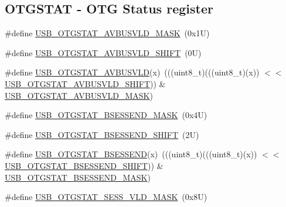 \subsection*{O\+T\+G\+S\+T\+AT -\/ O\+TG Status register}
\begin{DoxyCompactItemize}
\item 
\#define \mbox{\hyperlink{group___u_s_b___register___masks_gaad4e0319a6f42042472b52c8d1ec1c77}{U\+S\+B\+\_\+\+O\+T\+G\+S\+T\+A\+T\+\_\+\+A\+V\+B\+U\+S\+V\+L\+D\+\_\+\+M\+A\+SK}}~(0x1\+U)
\item 
\#define \mbox{\hyperlink{group___u_s_b___register___masks_ga66258b09ad8ec5462b8594ce5ac7384c}{U\+S\+B\+\_\+\+O\+T\+G\+S\+T\+A\+T\+\_\+\+A\+V\+B\+U\+S\+V\+L\+D\+\_\+\+S\+H\+I\+FT}}~(0\+U)
\item 
\#define \mbox{\hyperlink{group___u_s_b___register___masks_ga5a189909285a57f1076d9c2f860d7b71}{U\+S\+B\+\_\+\+O\+T\+G\+S\+T\+A\+T\+\_\+\+A\+V\+B\+U\+S\+V\+LD}}(x)~(((uint8\+\_\+t)(((uint8\+\_\+t)(x)) $<$$<$ \mbox{\hyperlink{group___u_s_b___register___masks_ga66258b09ad8ec5462b8594ce5ac7384c}{U\+S\+B\+\_\+\+O\+T\+G\+S\+T\+A\+T\+\_\+\+A\+V\+B\+U\+S\+V\+L\+D\+\_\+\+S\+H\+I\+FT}})) \& \mbox{\hyperlink{group___u_s_b___register___masks_gaad4e0319a6f42042472b52c8d1ec1c77}{U\+S\+B\+\_\+\+O\+T\+G\+S\+T\+A\+T\+\_\+\+A\+V\+B\+U\+S\+V\+L\+D\+\_\+\+M\+A\+SK}})
\item 
\#define \mbox{\hyperlink{group___u_s_b___register___masks_gabcc7c3e58301a6abc07915a5deb92d39}{U\+S\+B\+\_\+\+O\+T\+G\+S\+T\+A\+T\+\_\+\+B\+S\+E\+S\+S\+E\+N\+D\+\_\+\+M\+A\+SK}}~(0x4\+U)
\item 
\#define \mbox{\hyperlink{group___u_s_b___register___masks_ga6eb987e49a137057c02e8f2b26e61724}{U\+S\+B\+\_\+\+O\+T\+G\+S\+T\+A\+T\+\_\+\+B\+S\+E\+S\+S\+E\+N\+D\+\_\+\+S\+H\+I\+FT}}~(2\+U)
\item 
\#define \mbox{\hyperlink{group___u_s_b___register___masks_ga65d653ad5cca1c118a26385b74ab9c40}{U\+S\+B\+\_\+\+O\+T\+G\+S\+T\+A\+T\+\_\+\+B\+S\+E\+S\+S\+E\+ND}}(x)~(((uint8\+\_\+t)(((uint8\+\_\+t)(x)) $<$$<$ \mbox{\hyperlink{group___u_s_b___register___masks_ga6eb987e49a137057c02e8f2b26e61724}{U\+S\+B\+\_\+\+O\+T\+G\+S\+T\+A\+T\+\_\+\+B\+S\+E\+S\+S\+E\+N\+D\+\_\+\+S\+H\+I\+FT}})) \& \mbox{\hyperlink{group___u_s_b___register___masks_gabcc7c3e58301a6abc07915a5deb92d39}{U\+S\+B\+\_\+\+O\+T\+G\+S\+T\+A\+T\+\_\+\+B\+S\+E\+S\+S\+E\+N\+D\+\_\+\+M\+A\+SK}})
\item 
\#define \mbox{\hyperlink{group___u_s_b___register___masks_ga9158e279053f0f684c33cba2ec1e68ee}{U\+S\+B\+\_\+\+O\+T\+G\+S\+T\+A\+T\+\_\+\+S\+E\+S\+S\+\_\+\+V\+L\+D\+\_\+\+M\+A\+SK}}~(0x8\+U)

\end{DoxyCompactItemize}

